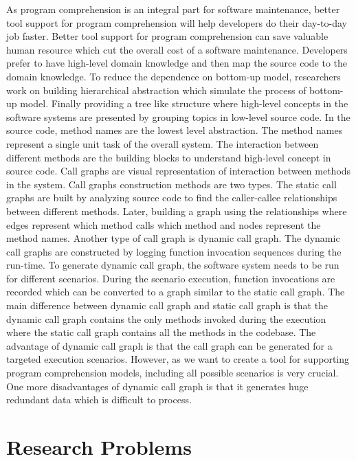  As program comprehension is an integral part for software maintenance, better tool support for program comprehension will help developers do their day-to-day job faster. Better tool support for program comprehension can save valuable human resource which cut the overall cost of a software maintenance. Developers prefer to have high-level domain knowledge and then map the source code to the domain knowledge. To reduce the dependence on bottom-up model, researchers work on building hierarchical abstraction which simulate the process of bottom-up model. Finally providing a tree like structure where high-level concepts in the software systems are presented by grouping topics in low-level source code. 
\newpage
In the source code, method names are the lowest level abstraction. The method names represent a single unit task of the overall system. The interaction between different methods are the building blocks to understand high-level concept in source code. Call graphs are visual representation of interaction between methods in the system. Call graphs construction methods are two types. The static call graphs are built by analyzing source code to find the caller-callee relationships between different methods. Later, building a graph using the relationships where edges represent which method calls which method and nodes represent the method names. Another type of call graph is dynamic call graph. The dynamic call graphs are constructed by logging function invocation sequences during the run-time. To generate dynamic call graph, the software system needs to be run for different scenarios. During the scenario execution, function invocations are recorded which can be converted to a graph similar to the static call graph. The main difference between dynamic call graph and static call graph is that the dynamic call graph contains the only methods invoked during the execution where the static call graph contains all the methods in the codebase. The advantage of dynamic call graph is that the call graph can be generated for a targeted execution scenarios. However, as we want to create a tool for supporting program comprehension models, including all possible scenarios is very crucial. One more disadvantages of dynamic call graph is that it generates huge redundant data which is difficult to process. 


 
\newpage

\section{Research Problems}

